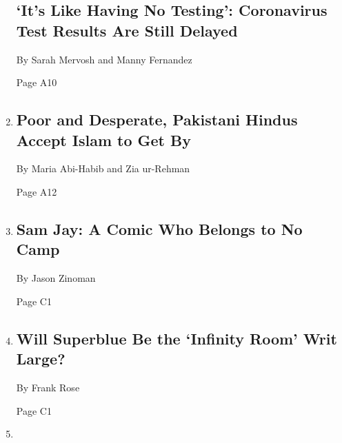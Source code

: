 \begin{enumerate}
  \hypertarget{its-like-having-no-testing-coronavirus-test-results-are-still-delayed}{%
  \subsection{`It's Like Having No Testing': Coronavirus Test Results
  Are Still
  Delayed}\label{its-like-having-no-testing-coronavirus-test-results-are-still-delayed}}

  By Sarah Mervosh and Manny Fernandez

  Page A10
\item
  \href{/2020/08/04/world/asia/pakistan-hindu-conversion.html}{}

  \hypertarget{poor-and-desperate-pakistani-hindus-accept-islam-to-get-by}{%
  \subsection{Poor and Desperate, Pakistani Hindus Accept Islam to Get
  By}\label{poor-and-desperate-pakistani-hindus-accept-islam-to-get-by}}

  By Maria Abi-Habib and Zia ur-Rehman

  Page A12
\item
  \href{/2020/08/04/arts/television/sam-jay-netflix-special.html}{}

  \hypertarget{sam-jay-a-comic-who-belongs-to-no-camp}{%
  \subsection{Sam Jay: A Comic Who Belongs to No
  Camp}\label{sam-jay-a-comic-who-belongs-to-no-camp}}

  By Jason Zinoman

  Page C1
\item
  \href{/2020/08/04/arts/superblue-immersive-art-pace-jobs.html}{}

  \hypertarget{will-superblue-be-the-infinity-room-writ-large}{%
  \subsection{Will Superblue Be the `Infinity Room' Writ
  Large?}\label{will-superblue-be-the-infinity-room-writ-large}}

  By Frank Rose

  Page C1
\item
  \href{/2020/08/04/us/politics/trump-homeland-security.html}{}

  \hypertarget{meet-the-official-accused-of-helping-trump-politicize-homeland-security}{%
}
\end{enumerate}
